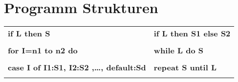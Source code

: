 \section{Programm Strukturen}
\begin{tabular}{p{9cm}p{9cm}}
	\hline
	\textbf{if L then S} & \textbf{if L then S1 else S2} \\
  	&  \\
	\hline
	\textbf{for I=n1 to n2 do} & \textbf{while L do S} \\
  	 & \\
	\hline
	\textbf{case I of I1:S1, I2:S2 ,\ldots , default:Sd} & \textbf{repeat S until L} \\
  	 &  \\
	\hline
\end{tabular}
